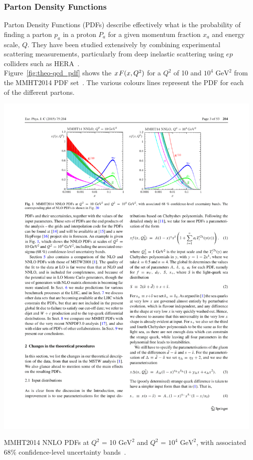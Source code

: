 \newpage
\subsubsection{Parton Density Functions}

Parton Density Functions (PDFs) describe effectively what is the probability of finding a parton $p_a$ in a proton $P_a$
for a given momentum fraction $x_a$ and energy scale, $Q$.
They have been studied extensively
by combining experimental scattering measurements,
particularly from deep inelastic scattering using $ep$ colliders such as HERA~\cite{theo-qcd_hera}.\\

Figure~\ref{fig:theo-qcd_pdf} shows the $x\hspace{0.3mm}F(x,Q^2)$ for a $Q^2$ of 10 and $10^4$ $\text{GeV}^2$
from the MMHT2014 PDF set~\cite{theo-qcd_pdf}.
The various colours lines represent the PDF for each of the different partons.\\

\begin{table}[!hbt]
  \begin{center}
    \includegraphics[width=1\linewidth, angle=0]{figs/Theory/qcd_pdf.pdf}
  \end{center}
  \caption[MMHT2014 NNLO PDFs at $Q^2$ = 10 $\text{GeV}^2$ and $Q^2$ = $10^4$ $\text{GeV}^2$, with associated 68\% confidence-level uncertainty bands.]
  {MMHT2014 NNLO PDFs at $Q^2$ = 10 $\text{GeV}^2$ and $Q^2$ = $10^4$ $\text{GeV}^2$, with associated 68\% confidence-level uncertainty bands~\cite{theo-qcd_pdf}.}
  \label{fig:theo-qcd_pdf}
\end{table}


